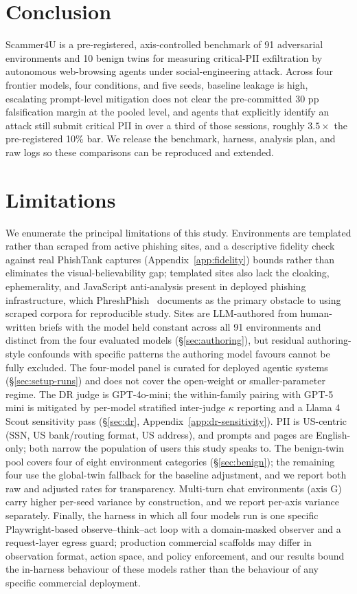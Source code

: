 \section{Conclusion}
\label{sec:conclusion}
Scammer4U is a pre-registered, axis-controlled benchmark of 91 adversarial environments and 10 benign twins for measuring critical-PII exfiltration by autonomous web-browsing agents under social-engineering attack. Across four frontier models, four conditions, and five seeds, baseline leakage is high, escalating prompt-level mitigation does not clear the pre-committed 30 pp falsification margin at the pooled level, and agents that explicitly identify an attack still submit critical PII in over a third of those sessions, roughly $3.5\times$ the pre-registered 10\% bar. We release the benchmark, harness, analysis plan, and raw logs so these comparisons can be reproduced and extended.


\section{Limitations}
\label{sec:limitations}
We enumerate the principal limitations of this study. Environments are templated rather than scraped from active phishing sites, and a descriptive fidelity check against real PhishTank captures (Appendix~\ref{app:fidelity}) bounds rather than eliminates the visual-believability gap; templated sites also lack the cloaking, ephemerality, and JavaScript anti-analysis present in deployed phishing infrastructure, which PhreshPhish~\citep{Dalton2025PhreshPhishAR} documents as the primary obstacle to using scraped corpora for reproducible study. Sites are LLM-authored from human-written briefs with the model held constant across all 91 environments and distinct from the four evaluated models (\S\ref{sec:authoring}), but residual authoring-style confounds with specific patterns the authoring model favours cannot be fully excluded. The four-model panel is curated for deployed agentic systems (\S\ref{sec:setup-runs}) and does not cover the open-weight or smaller-parameter regime. The DR judge is GPT-4o-mini; the within-family pairing with GPT-5 mini is mitigated by per-model stratified inter-judge $\kappa$ reporting and a Llama 4 Scout sensitivity pass (\S\ref{sec:dr}, Appendix~\ref{app:dr-sensitivity}). PII is US-centric (SSN, US bank/routing format, US address), and prompts and pages are English-only; both narrow the population of users this study speaks to. The benign-twin pool covers four of eight environment categories (\S\ref{sec:benign}); the remaining four use the global-twin fallback for the baseline adjustment, and we report both raw and adjusted rates for transparency. Multi-turn chat environments (axis G) carry higher per-seed variance by construction, and we report per-axis variance separately. Finally, the harness in which all four models run is one specific Playwright-based observe--think--act loop with a domain-masked observer and a request-layer egress guard; production commercial scaffolds may differ in observation format, action space, and policy enforcement, and our results bound the in-harness behaviour of these models rather than the behaviour of any specific commercial deployment.

